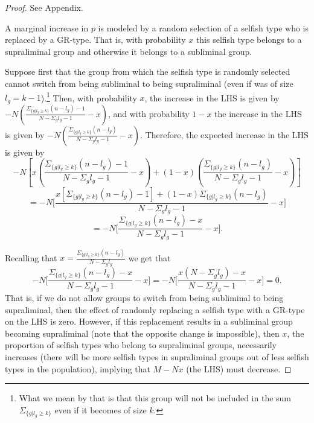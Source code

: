 \documentclass[12pt,a4paper]{article}
\newcommand{\mm}[1]{{\color{red} #1}}
\begin{document}
\begin{proof}
    See Appendix.
    
    \mm{
    A marginal increase in $p$ is modeled by a random selection of a selfish type who is replaced by a GR-type. That is, with probability $x$ this selfish type belongs to a supraliminal group and otherwise it belongs to a subliminal group.

    Suppose first that the group from which the selfish type is randomly selected cannot switch from being subliminal to being supraliminal (even if was of size $l_g=k-1$).\footnote{\mm{What we mean by that is that this group will not be included in the sum $\Sigma_{\{g|l_g \geq k\}}$ even if it becomes of size $k$.}}
    Then, with probability $x$, the increase in the LHS is given by $-N(\frac{\Sigma_{\{g|l_g \geq k\}}(n-l_g)-1}{N-\Sigma_gl_g-1}-x)$, and with probability $1-x$ the increase in the LHS is given by $-N(\frac{\Sigma_{\{g|l_g \geq k\}}(n-l_g)}{N-\Sigma_gl_g-1}-x)$.
    Therefore, the expected increase in the LHS is given by
    \begin{equation*}
        -N[x(\frac{\Sigma_{\{g|l_g \geq k\}}(n-l_g)-1}{N-\Sigma_gl_g-1}-x)+(1-x)(\frac{\Sigma_{\{g|l_g \geq k\}}(n-l_g)}{N-\Sigma_gl_g-1}-x)] 
    \end{equation*}
    \begin{equation*}
        =-N\big[\frac{x[\Sigma_{\{g|l_g \geq k\}}(n-l_g)-1]+(1-x)\Sigma_{\{g|l_g \geq k\}}(n-l_g)}{N-\Sigma_gl_g-1}-x \big]
    \end{equation*}
    \begin{equation*}
        =-N\big[\frac{\Sigma_{\{g|l_g \geq k\}}(n-l_g)-x}{N-\Sigma_gl_g-1}-x \big].
    \end{equation*}

    Recalling that $x=\frac{\Sigma_{\{g|l_g \geq k\}}(n-l_g)}{N-\Sigma_gl_g}$ we get that
    \begin{equation*}
       -N\big[\frac{\Sigma_{\{g|l_g \geq k\}}(n-l_g)-x}{N-\Sigma_gl_g-1}-x \big]= -N\big[\frac{x(N-\Sigma_gl_g)-x}{N-\Sigma_gl_g-1}-x \big]=0.
    \end{equation*}
   That is, if we do not allow groups to switch from being subliminal to being supraliminal, then the effect of randomly replacing a selfish type with a GR-type on the LHS is zero. However, if this replacement results in a subliminal group becoming supraliminal (note that the opposite change is impossible), then $x$, the proportion of selfish types who belong to supraliminal groups, necessarily increases (there will be more selfish types in supraliminal groups out of less selfish types in the population), implying that $M-Nx$ (the LHS) must decrease.
            }
\end{proof}
\end{document}
